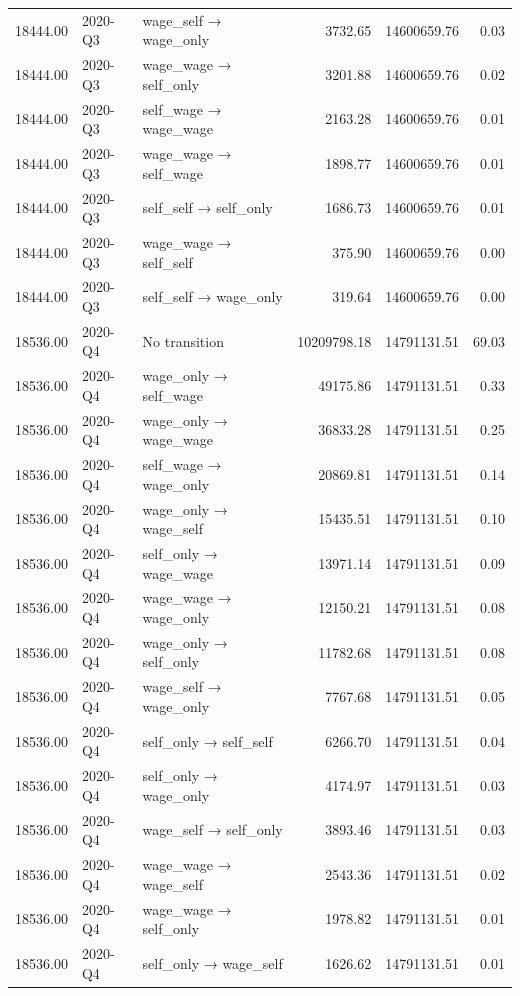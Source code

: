 \begin{table}[ht]
{\begin{tabular}{rllrrr}
  18444.00 & 2020-Q3 & wage\_self → wage\_only & 3732.65 & 14600659.76 & 0.03 \\ 
  18444.00 & 2020-Q3 & wage\_wage → self\_only & 3201.88 & 14600659.76 & 0.02 \\ 
  18444.00 & 2020-Q3 & self\_wage → wage\_wage & 2163.28 & 14600659.76 & 0.01 \\ 
  18444.00 & 2020-Q3 & wage\_wage → self\_wage & 1898.77 & 14600659.76 & 0.01 \\ 
  18444.00 & 2020-Q3 & self\_self → self\_only & 1686.73 & 14600659.76 & 0.01 \\ 
  18444.00 & 2020-Q3 & wage\_wage → self\_self & 375.90 & 14600659.76 & 0.00 \\ 
  18444.00 & 2020-Q3 & self\_self → wage\_only & 319.64 & 14600659.76 & 0.00 \\ 
  18536.00 & 2020-Q4 & No transition & 10209798.18 & 14791131.51 & 69.03 \\ 
  18536.00 & 2020-Q4 & wage\_only → self\_wage & 49175.86 & 14791131.51 & 0.33 \\ 
  18536.00 & 2020-Q4 & wage\_only → wage\_wage & 36833.28 & 14791131.51 & 0.25 \\ 
  18536.00 & 2020-Q4 & self\_wage → wage\_only & 20869.81 & 14791131.51 & 0.14 \\ 
  18536.00 & 2020-Q4 & wage\_only → wage\_self & 15435.51 & 14791131.51 & 0.10 \\ 
  18536.00 & 2020-Q4 & self\_only → wage\_wage & 13971.14 & 14791131.51 & 0.09 \\ 
  18536.00 & 2020-Q4 & wage\_wage → wage\_only & 12150.21 & 14791131.51 & 0.08 \\ 
  18536.00 & 2020-Q4 & wage\_only → self\_only & 11782.68 & 14791131.51 & 0.08 \\ 
  18536.00 & 2020-Q4 & wage\_self → wage\_only & 7767.68 & 14791131.51 & 0.05 \\ 
  18536.00 & 2020-Q4 & self\_only → self\_self & 6266.70 & 14791131.51 & 0.04 \\ 
  18536.00 & 2020-Q4 & self\_only → wage\_only & 4174.97 & 14791131.51 & 0.03 \\ 
  18536.00 & 2020-Q4 & wage\_self → self\_only & 3893.46 & 14791131.51 & 0.03 \\ 
  18536.00 & 2020-Q4 & wage\_wage → wage\_self & 2543.36 & 14791131.51 & 0.02 \\ 
  18536.00 & 2020-Q4 & wage\_wage → self\_only & 1978.82 & 14791131.51 & 0.01 \\ 
  18536.00 & 2020-Q4 & self\_only → wage\_self & 1626.62 & 14791131.51 & 0.01 \\ 

\end{tabular}}
\end{table}
